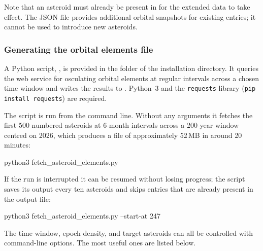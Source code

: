 Note that an asteroid must already be present in
 for the extended data to take effect.  The
JSON file provides additional orbital snapshots for existing entries; it
cannot be used to introduce new asteroids.
 
\subsubsection{Generating the orbital elements file}
\label{sec:ssystem.ini:MultiEpoch:Script}
 
A Python script, , is provided in
the  folder of the installation directory.  It queries the
 web service for osculating orbital elements at
regular intervals across a chosen time window and writes the results to
.  Python~3 and the \texttt{requests}
library (\texttt{pip install requests}) are required.
 
The script is run from the command line.  Without any arguments it
fetches the first 500 numbered asteroids at 6-month intervals across a
200-year window centred on 2026, which produces a file of approximately
52\,MB in around 20 minutes:
 
\begin{commands}
python3 fetch_asteroid_elements.py
\end{commands}
 
\noindent If the run is interrupted it can be resumed without losing
progress; the script saves its output every ten asteroids and skips
entries that are already present in the output file:
 
\begin{commands}
python3 fetch_asteroid_elements.py --start-at 247
\end{commands}
 
\noindent The time window, epoch density, and target asteroids can all
be controlled with command-line options.  The most useful ones are
listed below.
 
